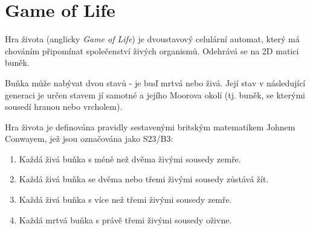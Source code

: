 \newcommand{\subject}{BPC-PC2M}
\newcommand{\subjectname}{Závěrečný projekt}
\newcommand{\authors}{Filip Poloček, 240875}
\newcommand{\docdesc}{Game of Life}
\newcommand{\docgroup}{}
\newcommand{\docurl}{https://github.com/krysar/Game-of-life}

\newcommand{\docminted}{true}





\titulka{}

\tableofcontents
\thispagestyle{empty}

\setcounter{page}{0}

\newpage

\section{Game of Life}
\label{sec:gol}
Hra života (anglicky \textit{Game of Life}) je dvoustavový celulární automat, který má chováním připomínat společenství živých organismů. Odehrává se na 2D matici buněk.

Buňka může nabývat dvou stavů - je buď mrtvá nebo živá. Její stav v následující generaci je určen stavem jí samotné a jejího Moorova okolí (tj. buněk, se kterými sousedí hranou nebo vrcholem).

Hra života je definována pravidly sestavenými britským matematikem Johnem Conwayem, jež jsou označována jako S23/B3:
\begin{enumerate}
	\item Každá živá buňka s méně než dvěma živými sousedy zemře.
	\item Každá živá buňka se dvěma nebo třemi živými sousedy zůstává žít.
	\item Každá živá buňka s více než třemi živými sousedy zemře.
	\item Každá mrtvá buňka s právě třemi živými sousedy oživne.
\end{enumerate}

